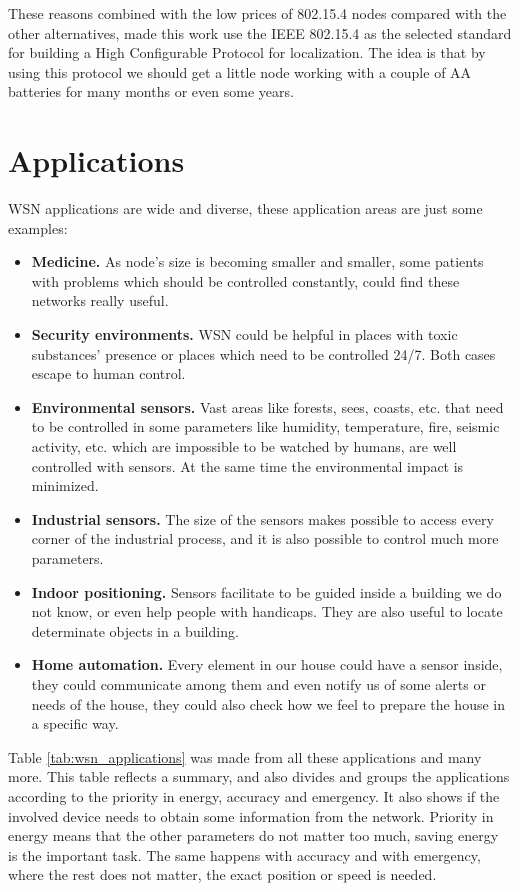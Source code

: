 These reasons combined with the low prices of 802.15.4 nodes compared with the other alternatives, made this work use the \ac{IEEE} 802.15.4 
as the selected standard for building a High Configurable Protocol for localization. The idea is that by using this protocol we should
get a little node working with a couple of AA batteries for many months or even some years.

\section{Applications}

\ac{WSN} applications are wide and diverse, these application areas are just some examples:

\begin{itemize}
 \item \textbf{Medicine.} As node's size is becoming smaller and smaller, some patients with problems which should be controlled constantly,
could find these networks really useful.
 \item \textbf{Security environments.} \ac{WSN} could be helpful in places with toxic substances' presence or places which need to be controlled
24/7. Both cases escape to human control.
 \item \textbf{Environmental sensors.} Vast areas like forests, sees, coasts, etc. that need to be controlled in some parameters like
humidity, temperature, fire, seismic activity, etc. which are impossible to be watched by humans, are well controlled with sensors. At the same 
time the environmental impact is minimized.
 \item \textbf{Industrial sensors.} The size of the sensors makes possible to access every corner of the industrial process, and it is also
possible to control much more parameters.
 \item \textbf{Indoor positioning.} Sensors facilitate to be guided inside a building we do not know, or even help people with handicaps.
They are also useful to locate determinate objects in a building.
 \item \textbf{Home automation.} Every element in our house could have a sensor inside, they could communicate among them and even notify us
of some alerts or needs of the house, they could also check how we feel to prepare the house in a specific way.
\end{itemize}

Table \ref{tab:wsn_applications} was made from all these applications and many more. This table reflects a summary, and also divides and groups
the applications according to the priority in energy, accuracy and emergency. It also shows if the involved device needs to obtain some information
from the network. Priority in energy means that the other parameters do not matter too much, saving energy is the important task. 
The same happens with accuracy and with emergency, where the rest does not matter, the exact position or speed is needed.

